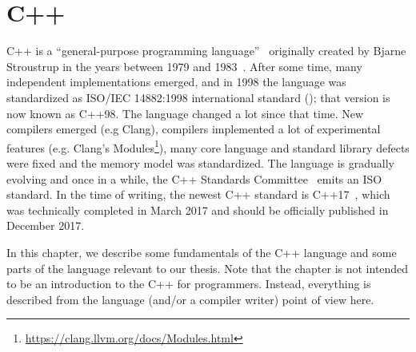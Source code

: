 \documentclass[nolot,nolof,nocover,printed]{fithesis3}
\begin{document}







%

\chapter{C++}

C++ is a \enquote{general-purpose programming language}~\cite{bjarne-cpp} originally created by Bjarne Stroustrup in the years between 1979 and 1983~\cite{bjarne-faq}. After some time, many independent implementations emerged, and in 1998 the language was standardized as ISO/IEC 14882:1998 international standard (\cite{ISOcpp98}); that version is now known as C++98. The language changed a lot since that time. New compilers emerged (e.g Clang), compilers implemented a lot of experimental features (e.g. Clang's Modules\footnote{\url{https://clang.llvm.org/docs/Modules.html}}), many core language and standard library defects were fixed and the memory model was standardized. The language is gradually evolving and once in a while, the C++ Standards Committee~\cite{wg21home} emits an ISO standard. In the time of writing, the newest C++ standard is C++17~\cite{ISOcpp17}, which was technically completed in March 2017 and should be officially published in December 2017.

In this chapter, we describe some fundamentals of the C++ language and some parts of the language relevant to our thesis. Note that the chapter is not intended to be an introduction to the C++ for programmers. Instead, everything is described from the language (and/or a compiler writer) point of view here.
\end{document}
